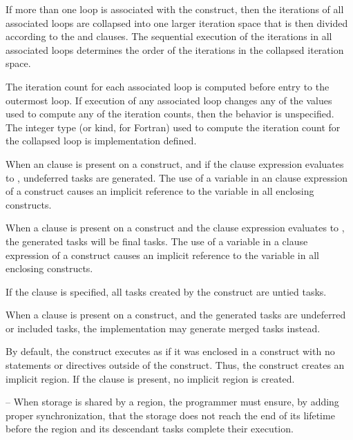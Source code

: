 If more than one loop is associated with the  construct, then the iterations of all associated loops are collapsed into one larger iteration space that is then divided according to the  and  clauses. The sequential execution of the iterations in all associated loops determines the order of the iterations in the collapsed iteration space.

The iteration count for each associated loop is computed before entry to the outermost loop. If execution of any associated loop changes any of the values used to compute any of the iteration counts, then the behavior is unspecified. The integer type (or kind, for Fortran) used to compute the iteration count for the collapsed loop is implementation defined.

When an  clause is present on a  construct, and if the  clause expression evaluates to , undeferred tasks are generated. The use of a variable in an  clause expression of a  construct causes an implicit reference to the variable in all enclosing constructs.

When a  clause is present on a  construct and the  clause expression evaluates to , the generated tasks will be final tasks. The use of a variable in a  clause expression of a  construct causes an implicit reference to the variable in all enclosing constructs.

If the  clause is specified, all tasks created by the  construct are untied tasks.

When a  clause is present on a  construct, and the generated tasks are undeferred or included tasks, the implementation may generate merged tasks instead.

By default, the  construct executes as if it was enclosed in a  construct with no statements or directives outside of the  construct. Thus, the  construct creates an implicit  region. If the  clause is present, no implicit  region is created.

\notestart
\noteheader – When storage is shared by a  region, the programmer must ensure, by adding proper synchronization, that the storage does not reach the end of its lifetime before the  region and its descendant tasks complete their execution.
\noteend

